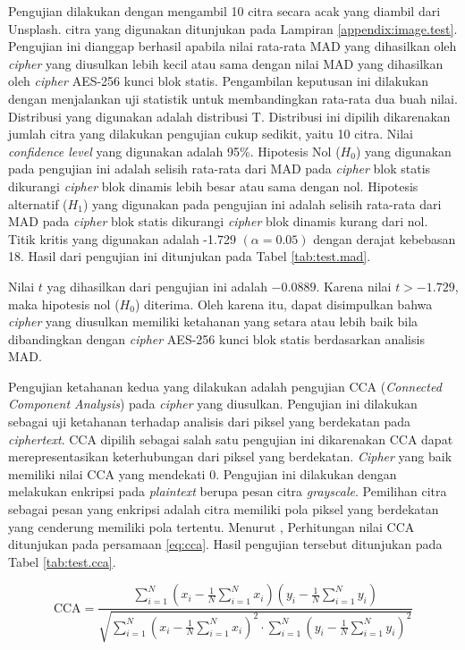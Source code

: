 Pengujian dilakukan dengan mengambil 10 citra secara acak yang diambil dari Unsplash. citra yang digunakan ditunjukan pada Lampiran \ref{appendix:image.test}. Pengujian ini dianggap berhasil apabila nilai rata-rata MAD yang dihasilkan oleh \emph{cipher} yang diusulkan lebih kecil atau sama dengan nilai MAD yang dihasilkan oleh \emph{cipher} AES-256 kunci blok statis. Pengambilan keputusan ini dilakukan dengan menjalankan uji statistik untuk membandingkan rata-rata dua buah nilai. Distribusi yang digunakan adalah distribusi T. Distribusi ini dipilih dikarenakan jumlah citra yang dilakukan pengujian cukup sedikit, yaitu 10 citra. Nilai \emph{confidence level} yang digunakan adalah 95\%. Hipotesis Nol ($H_0$) yang digunakan pada pengujian ini adalah selisih rata-rata dari MAD pada \emph{cipher} blok statis dikurangi \emph{cipher} blok dinamis lebih besar atau sama dengan nol. Hipotesis alternatif ($H_1$) yang digunakan pada pengujian ini adalah selisih rata-rata dari MAD pada \emph{cipher} blok statis dikurangi \emph{cipher} blok dinamis kurang dari nol. Titik kritis yang digunakan adalah -1.729 $(\alpha = 0.05)$ dengan derajat kebebasan 18. Hasil dari pengujian ini ditunjukan pada Tabel \ref{tab:test.mad}.

Nilai $t$ yag dihasilkan dari pengujian ini adalah $-0.0889$. Karena nilai $t > -1.729$, maka hipotesis nol ($H_0$) diterima. Oleh karena itu, dapat disimpulkan bahwa \emph{cipher} yang diusulkan memiliki ketahanan yang setara atau lebih baik bila dibandingkan dengan \emph{cipher} AES-256 kunci blok statis berdasarkan analisis MAD.

Pengujian ketahanan kedua yang dilakukan adalah pengujian CCA (\emph{Connected Component Analysis}) pada \emph{cipher} yang diusulkan. Pengujian ini dilakukan sebagai uji ketahanan terhadap analisis dari piksel yang berdekatan pada \emph{ciphertext}. CCA dipilih sebagai salah satu pengujian ini dikarenakan CCA dapat merepresentasikan keterhubungan dari piksel yang berdekatan. \emph{Cipher} yang baik memiliki nilai CCA yang mendekati 0. Pengujian ini dilakukan dengan melakukan enkripsi pada \emph{plaintext} berupa pesan citra \emph{grayscale}. Pemilihan citra sebagai pesan yang enkripsi adalah citra memiliki pola piksel yang berdekatan yang cenderung memiliki pola tertentu. Menurut \textcite{lin2021}, Perhitungan nilai CCA ditunjukan pada persamaan \ref{eq:cca}. Hasil pengujian tersebut ditunjukan pada Tabel \ref{tab:test.cca}. 

\begin{equation}
  \text{CCA} = \frac{\sum_{i=1}^{N}{(x_i - \frac{1}{N} \sum_{i=1}^{N} {x_i})(y_i - \frac{1}{N} \sum_{i=1}^{N} {y_i})}}
  {\sqrt{\sum_{i=1}^{N}{(x_i - \frac{1}{N} \sum_{i=1}^{N} {x_i})^2} \cdot \sum_{i=1}^{N}{(y_i - \frac{1}{N} \sum_{i=1}^{N} {y_i})^2}}}
  \label{eq:cca}
\end{equation}

